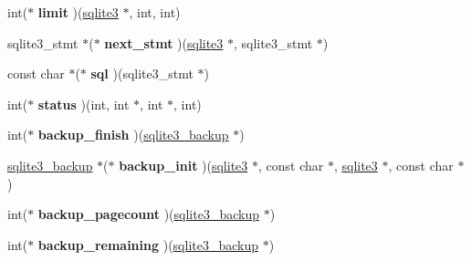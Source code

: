 \begin{DoxyCompactItemize}
\item 
\hypertarget{structsqlite3__api__routines_aa48e99fcfae600229799f773c3edfef6}{int($\ast$ {\bfseries limit} )(\hyperlink{structsqlite3}{sqlite3} $\ast$, int, int)}\label{structsqlite3__api__routines_aa48e99fcfae600229799f773c3edfef6}

\item 
\hypertarget{structsqlite3__api__routines_a5629a4f4840068678d7429f1e0939d97}{sqlite3\-\_\-stmt $\ast$($\ast$ {\bfseries next\-\_\-stmt} )(\hyperlink{structsqlite3}{sqlite3} $\ast$, sqlite3\-\_\-stmt $\ast$)}\label{structsqlite3__api__routines_a5629a4f4840068678d7429f1e0939d97}

\item 
\hypertarget{structsqlite3__api__routines_aca8e71f936e7e8c822588b82687ab129}{const char $\ast$($\ast$ {\bfseries sql} )(sqlite3\-\_\-stmt $\ast$)}\label{structsqlite3__api__routines_aca8e71f936e7e8c822588b82687ab129}

\item 
\hypertarget{structsqlite3__api__routines_a0021bed44509b5085f5187db3aa43eb8}{int($\ast$ {\bfseries status} )(int, int $\ast$, int $\ast$, int)}\label{structsqlite3__api__routines_a0021bed44509b5085f5187db3aa43eb8}

\item 
\hypertarget{structsqlite3__api__routines_abb9900ba9f5faed0031817665594eeec}{int($\ast$ {\bfseries backup\-\_\-finish} )(\hyperlink{structsqlite3__backup}{sqlite3\-\_\-backup} $\ast$)}\label{structsqlite3__api__routines_abb9900ba9f5faed0031817665594eeec}

\item 
\hypertarget{structsqlite3__api__routines_acde910f4e49914357c4939f434bca34b}{\hyperlink{structsqlite3__backup}{sqlite3\-\_\-backup} $\ast$($\ast$ {\bfseries backup\-\_\-init} )(\hyperlink{structsqlite3}{sqlite3} $\ast$, const char $\ast$, \hyperlink{structsqlite3}{sqlite3} $\ast$, const char $\ast$)}\label{structsqlite3__api__routines_acde910f4e49914357c4939f434bca34b}

\item 
\hypertarget{structsqlite3__api__routines_ac796f94cb46e331a880131b5dc67e635}{int($\ast$ {\bfseries backup\-\_\-pagecount} )(\hyperlink{structsqlite3__backup}{sqlite3\-\_\-backup} $\ast$)}\label{structsqlite3__api__routines_ac796f94cb46e331a880131b5dc67e635}

\item 
\hypertarget{structsqlite3__api__routines_ae376d7dfa771f1c72272b32e2203c6f1}{int($\ast$ {\bfseries backup\-\_\-remaining} )(\hyperlink{structsqlite3__backup}{sqlite3\-\_\-backup} $\ast$)}\label{structsqlite3__api__routines_ae376d7dfa771f1c72272b32e2203c6f1}


\end{DoxyCompactItemize}
